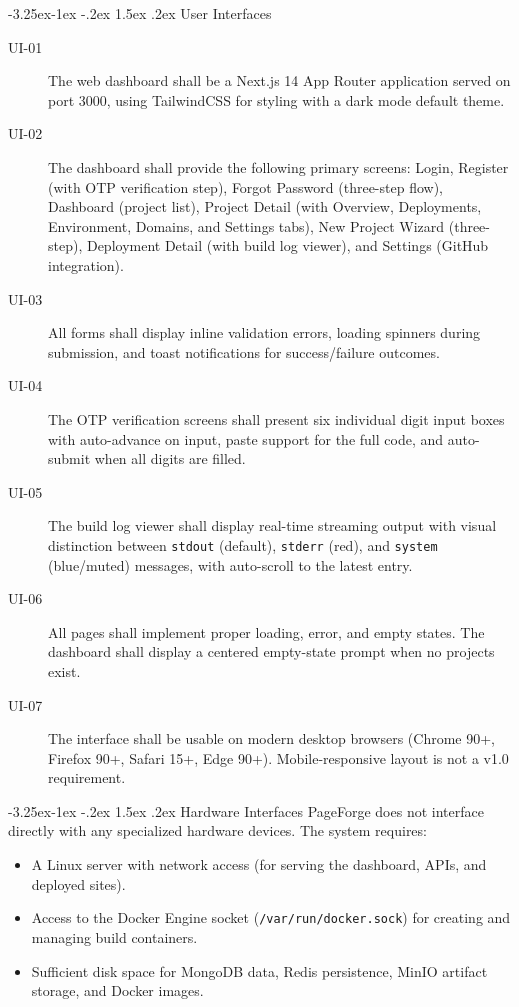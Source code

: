 \documentclass[12pt,a4paper]{article}
\makeatletter
\renewcommand\subsection{\@startsection{subsection}{2}{\z@}%
  {-3.25ex\@plus -1ex \@minus -.2ex}%
  {1.5ex \@plus .2ex}%
  {\needspace{2\baselineskip}\normalfont\large\bfseries}}
\makeatother
\begin{document}
\subsection{User Interfaces}
\begin{description}
    \item[UI-01] The web dashboard shall be a Next.js 14 App Router application served on port 3000, using TailwindCSS for styling with a dark mode default theme.
    \item[UI-02] The dashboard shall provide the following primary screens: Login, Register (with OTP verification step), Forgot Password (three-step flow), Dashboard (project list), Project Detail (with Overview, Deployments, Environment, Domains, and Settings tabs), New Project Wizard (three-step), Deployment Detail (with build log viewer), and Settings (GitHub integration).
    \item[UI-03] All forms shall display inline validation errors, loading spinners during submission, and toast notifications for success/failure outcomes.
    \item[UI-04] The OTP verification screens shall present six individual digit input boxes with auto-advance on input, paste support for the full code, and auto-submit when all digits are filled.
    \item[UI-05] The build log viewer shall display real-time streaming output with visual distinction between \texttt{stdout} (default), \texttt{stderr} (red), and \texttt{system} (blue/muted) messages, with auto-scroll to the latest entry.
    \item[UI-06] All pages shall implement proper loading, error, and empty states. The dashboard shall display a centered empty-state prompt when no projects exist.
    \item[UI-07] The interface shall be usable on modern desktop browsers (Chrome 90+, Firefox 90+, Safari 15+, Edge 90+). Mobile-responsive layout is not a v1.0 requirement.
\end{description}

\subsection{Hardware Interfaces}
PageForge does not interface directly with any specialized hardware devices. The system requires:
\begin{itemize}
    \item A Linux server with network access (for serving the dashboard, APIs, and deployed sites).
    \item Access to the Docker Engine socket (\texttt{/var/run/docker.sock}) for creating and managing build containers.
    \item Sufficient disk space for MongoDB data, Redis persistence, MinIO artifact storage, and Docker images.
\end{itemize}
\end{document}
